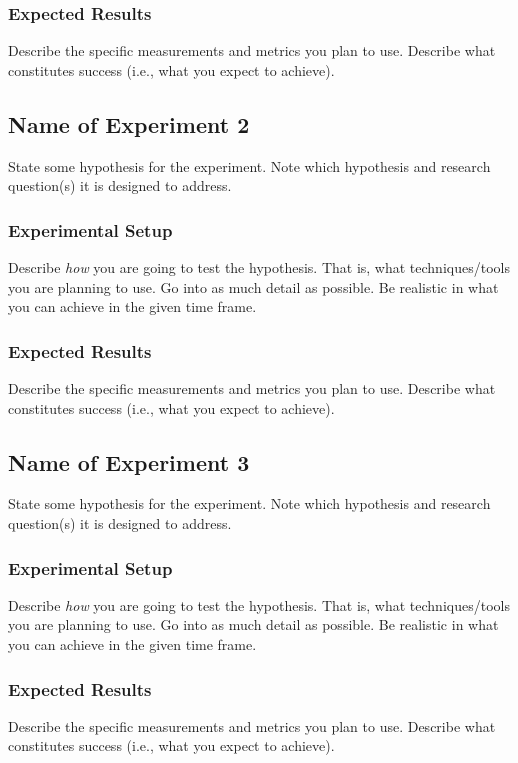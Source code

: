 \documentclass[10pt,twocolumn,pdftex]{article}
\begin{document}
\subsubsection{Expected Results}

Describe the specific measurements and metrics you plan to use. Describe
what constitutes success (i.e., what you expect to achieve).

\subsection{Name of Experiment 2}

State some hypothesis for the experiment. Note which hypothesis and
research question(s) it is designed to address.

\subsubsection{Experimental Setup}
Describe {\em how} you are going to test the hypothesis. That is, what
techniques/tools you are planning to use. Go into as much detail as
possible. Be realistic in what you can achieve in the given time frame.

\subsubsection{Expected Results}

Describe the specific measurements and metrics you plan to use. Describe
what constitutes success (i.e., what you expect to achieve).

\subsection{Name of Experiment 3}

State some hypothesis for the experiment. Note which hypothesis and
research question(s) it is designed to address.

\subsubsection{Experimental Setup}
Describe {\em how} you are going to test the hypothesis. That is, what
techniques/tools you are planning to use. Go into as much detail as
possible. Be realistic in what you can achieve in the given time frame.

\subsubsection{Expected Results}

Describe the specific measurements and metrics you plan to use. Describe
what constitutes success (i.e., what you expect to achieve).



\end{document}
